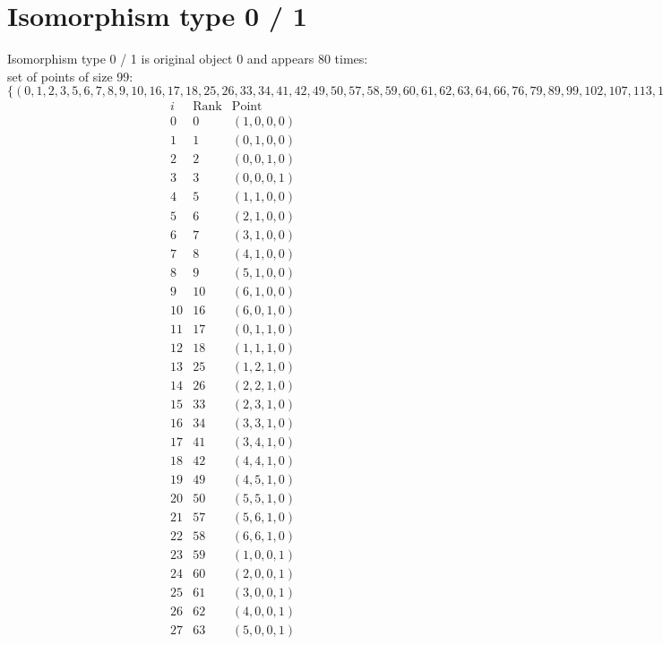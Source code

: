 \documentclass{article}
\begin{document}
{\section*{Isomorphism type 0 / 1}
Isomorphism type 0 / 1 is original object 0 and appears 80 times: \\
set of points of size 99: $\{( 0, 1, 2, 3, 5, 6, 7, 8, 9, 10, 16, 17, 18, 25, 26, 33, 34, 41, 42, 49, 50, 57, 58, 59, 60, 61, 62, 63, 64, 66, 76, 79, 89, 99, 102, 107, 113, 115, 117, 129, 131, 134, 140, 155, 160, 164, 166, 172, 173, 178, ...386, 393, 397 )\}$\\
$$
\begin{array}{|r|r|r|}
\hline
i & \mbox{Rank} & \mbox{Point} \\
\hline
\hline
0 & 0 & ( 1, 0, 0, 0 )\\
1 & 1 & ( 0, 1, 0, 0 )\\
2 & 2 & ( 0, 0, 1, 0 )\\
3 & 3 & ( 0, 0, 0, 1 )\\
4 & 5 & ( 1, 1, 0, 0 )\\
5 & 6 & ( 2, 1, 0, 0 )\\
6 & 7 & ( 3, 1, 0, 0 )\\
7 & 8 & ( 4, 1, 0, 0 )\\
8 & 9 & ( 5, 1, 0, 0 )\\
9 & 10 & ( 6, 1, 0, 0 )\\
10 & 16 & ( 6, 0, 1, 0 )\\
11 & 17 & ( 0, 1, 1, 0 )\\
12 & 18 & ( 1, 1, 1, 0 )\\
13 & 25 & ( 1, 2, 1, 0 )\\
14 & 26 & ( 2, 2, 1, 0 )\\
15 & 33 & ( 2, 3, 1, 0 )\\
16 & 34 & ( 3, 3, 1, 0 )\\
17 & 41 & ( 3, 4, 1, 0 )\\
18 & 42 & ( 4, 4, 1, 0 )\\
19 & 49 & ( 4, 5, 1, 0 )\\
20 & 50 & ( 5, 5, 1, 0 )\\
21 & 57 & ( 5, 6, 1, 0 )\\
22 & 58 & ( 6, 6, 1, 0 )\\
23 & 59 & ( 1, 0, 0, 1 )\\
24 & 60 & ( 2, 0, 0, 1 )\\
25 & 61 & ( 3, 0, 0, 1 )\\
26 & 62 & ( 4, 0, 0, 1 )\\
27 & 63 & ( 5, 0, 0, 1 )\\

\end{array}$$}
\end{document}
